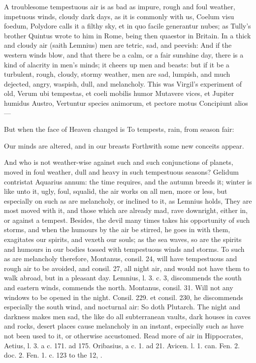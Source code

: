 {{A troublesome tempestuous air is as bad as impure, rough and foul
weather, impetuous winds, cloudy dark days, as it is commonly with us,
Coelum visu foedum, Polydore calls it a filthy sky, et in quo
facile generantur nubes; as Tully's brother Quintus wrote to him in
Rome, being then quaestor in Britain. In a thick and cloudy air (saith
Lemnius) men are tetric, sad, and peevish: And if the western winds
blow, and that there be a calm, or a fair sunshine day, there is a kind
of alacrity in men's minds; it cheers up men and beasts: but if it be a
turbulent, rough, cloudy, stormy weather, men are sad, lumpish, and
much dejected, angry, waspish, dull, and melancholy. This was
Virgil's experiment of old,
Verum ubi tempestas, et coeli mobilis humor
Mutavere vices, et Jupiter humidus Austro,
Vertuntur species animorum, et pectore motus
Concipiunt alios---


But when the face of Heaven changed is
To tempests, rain, from season fair:

Our minds are altered, and in our breasts
Forthwith some new conceits appear.

And who is not weather-wise against such and such conjunctions of
planets, moved in foul weather, dull and heavy in such tempestuous
seasons?  Gelidum contristat Aquarius annum: the time requires,
and the autumn breeds it; winter is like unto it, ugly, foul, squalid,
the air works on all men, more or less, but especially on such as are
melancholy, or inclined to it, as Lemnius holds, They are most
moved with it, and those which are already mad, rave downright, either
in, or against a tempest. Besides, the devil many times takes his
opportunity of such storms, and when the humours by the air be stirred,
he goes in with them, exagitates our spirits, and vexeth our souls; as
the sea waves, so are the spirits and humours in our bodies tossed with
tempestuous winds and storms. To such as are melancholy therefore,
Montanus, consil. 24, will have tempestuous and rough air to be
avoided, and consil. 27, all night air, and would not have them to walk
abroad, but in a pleasant day. Lemnius, l. 3. c. 3, discommends the
south and eastern winds, commends the north. Montanus, consil. 31.
Will not any windows to be opened in the night. Consil. 229. et
consil. 230, he discommends especially the south wind, and nocturnal
air: So doth Plutarch. The night and darkness makes men sad, the
like do all subterranean vaults, dark houses in caves and rocks, desert
places cause melancholy in an instant, especially such as have not been
used to it, or otherwise accustomed. Read more of air in Hippocrates,
Aetius, l. 3. a c. 171. ad 175. Oribasius, a c. 1. ad 21. Avicen. l. 1.
can. Fen. 2. doc. 2. Fen. 1. c. 123 to the 12, \etc{}.

}}
